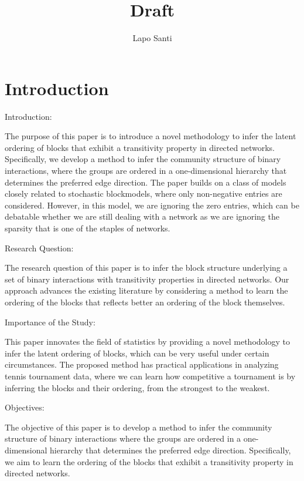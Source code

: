 \documentclass[11pt]{amsart}
\title{Draft}
\author{Lapo Santi}
\begin{document}
\maketitle
\tableofcontents

\newpage

\section{Introduction}
Introduction:

The purpose of this paper is to introduce a novel methodology to infer the latent ordering of blocks that exhibit a transitivity property in directed networks. Specifically, we develop a method to infer the community structure of binary interactions, where the groups are ordered in a one-dimensional hierarchy that determines the preferred edge direction. The paper builds on a class of models closely related to stochastic blockmodels, where only non-negative entries are considered. However, in this model, we are ignoring the zero entries, which can be debatable whether we are still dealing with a network as we are ignoring the sparsity that is one of the staples of networks.

Research Question:

The research question of this paper is to infer the block structure underlying a set of binary interactions with transitivity properties in directed networks. Our approach advances the existing literature by considering a method to learn the ordering of the blocks that reflects better an ordering of the block themselves.

Importance of the Study:

This paper innovates the field of statistics by providing a novel methodology to infer the latent ordering of blocks, which can be very useful under certain circumstances. The proposed method has practical applications in analyzing tennis tournament data, where we can learn how competitive a tournament is by inferring the blocks and their ordering, from the strongest to the weakest.

Objectives:

The objective of this paper is to develop a method to infer the community structure of binary interactions where the groups are ordered in a one-dimensional hierarchy that determines the preferred edge direction. Specifically, we aim to learn the ordering of the blocks that exhibit a transitivity property in directed networks.
\end{document}
